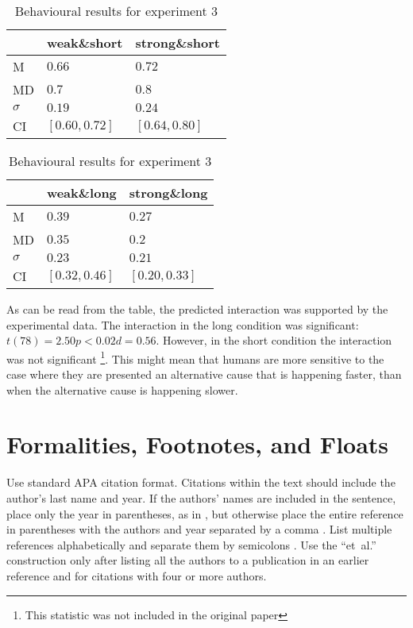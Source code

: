 \documentclass[10pt,letterpaper]{article}
\begin{document}
\begin{table}[H]
\begin{center} 
\caption{Behavioural results for experiment 3} 
\label{model preds} 
\vskip 0.12in
\begin{tabular}{lll} 
\toprule
& weak\&short & strong\&short \\
\midrule
	M & $0.66$ & $0.72$ \\ 
	MD & $0.7$ & $0.8$ \\
	$\sigma$ & $0.19$ & $0.24$ \\ 
	CI & $[0.60, 0.72]$ & $[0.64, 0.80]$ \\
\bottomrule
\end{tabular} 
\begin{tabular}{lll} 
\toprule
& weak\&long & strong\&long \\
\midrule
	M & $0.39$ & $0.27$ \\ 
	MD & $0.35$ & $0.2$ \\
	$\sigma$ & $0.23$ & $0.21$ \\ 
	CI & $[0.32, 0.46]$ & $[0.20, 0.33]$ \\
\bottomrule
\end{tabular} 
\end{center} 
\end{table}

As can be read from the table, the predicted interaction was supported by the experimental data. The interaction in the long condition was significant: 
$t(78) = 2.50 p < 0.02 d = 0.56$. However, in the short condition the interaction was not significant \footnote{This statistic was not included in the original paper}. This might mean that humans are more sensitive to the case where they are presented an alternative cause that is happening faster, than when the alternative cause is happening slower.  




\section{Formalities, Footnotes, and Floats}

Use standard APA citation format. Citations within the text should
include the author's last name and year. If the authors' names are
included in the sentence, place only the year in parentheses, as in
, but otherwise place the entire reference in
parentheses with the authors and year separated by a comma
\cite{NewellSimon1972a}. List multiple references alphabetically and
separate them by semicolons
\cite{ChalnickBillman1988a,NewellSimon1972a}. Use the
``et~al.'' construction only after listing all the authors to a
publication in an earlier reference and for citations with four or
more authors.
\end{document}
